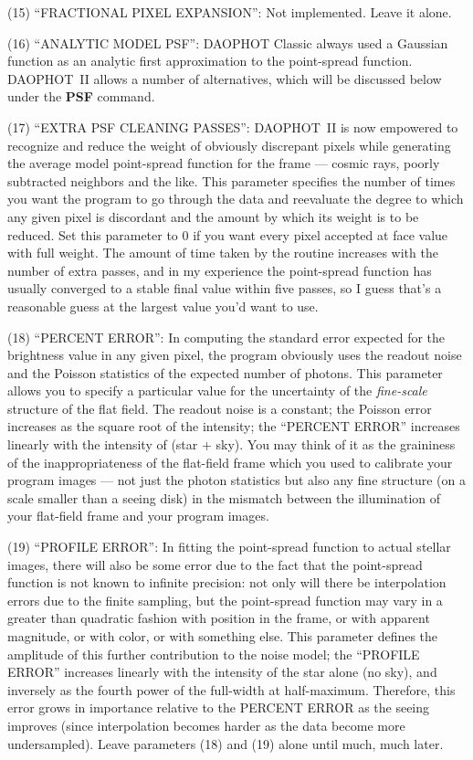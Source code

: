 \item{(15)} ``FRACTIONAL PIXEL EXPANSION'':  Not implemented.  Leave it
alone.

\item{(16)} ``ANALYTIC MODEL PSF'':  DAOPHOT Classic always used a
Gaussian function as an analytic first approximation to the
point-spread function.  DAOPHOT~II allows a number of alternatives,
which will be discussed below under the {\bf PSF} command.

\item{(17)}  ``EXTRA PSF CLEANING PASSES'':  DAOPHOT~II is now
empowered to recognize and reduce the weight of obviously discrepant
pixels while generating the average model point-spread function for the
frame --- cosmic rays, poorly subtracted neighbors and the like.  This
parameter specifies the number of times you want the program to go
through the data and reevaluate the degree to which any given pixel is
discordant and the amount by which its weight is to be reduced.  Set
this parameter to 0 if you want every pixel accepted at face value with
full weight.  The amount of time taken by the routine increases with
the number of extra passes, and in my experience the point-spread
function has usually converged to a stable final value within five
passes, so I guess that's a reasonable guess at the largest value you'd
want to use.

\item{(18)}  ``PERCENT ERROR'':  In computing the standard error
expected for the brightness value in any given pixel, the program
obviously uses the readout noise and the Poisson statistics of the
expected number of photons.  This parameter allows you to specify a
particular value for the uncertainty of the {\it fine-scale\/}
structure of the flat field.  The readout noise is a constant; the
Poisson error increases as the square root of the intensity; the
``PERCENT ERROR'' increases linearly with the intensity of (star +
sky).  You may think of it as the graininess of the inappropriateness
of the flat-field frame which you used to calibrate your program images
--- not just the photon statistics but also any fine structure (on a
scale smaller than a seeing disk) in the mismatch between the
illumination of your flat-field frame and your program images.

\item{(19)} ``PROFILE ERROR'':  In fitting the point-spread function to
actual stellar images, there will also be some error due to the fact
that the point-spread function is not known to infinite precision:  not
only will there be interpolation errors due to the finite sampling, but
the point-spread function may vary in a greater than quadratic fashion
with position in the frame, or with apparent magnitude, or with color,
or with something else.  This parameter defines the amplitude of this
further contribution to the noise model; the ``PROFILE ERROR''
increases linearly with the intensity of the star alone (no sky), and
inversely as the fourth power of the full-width at half-maximum.
Therefore, this error grows in importance relative to the PERCENT ERROR
as the seeing improves (since interpolation becomes harder as the data
become more undersampled). Leave parameters (18) and (19) alone until
much, much later.

